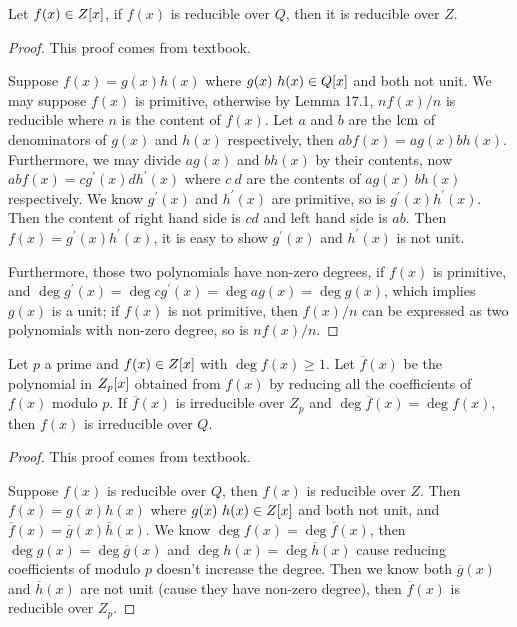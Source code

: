 \documentclass[../main.tex]{subfiles}
\begin{document}
\begin{theorem}
  Let $f(x) \in Z[x]$, if $f(x)$ is reducible over $Q$, then it is reducible over $Z$.
\end{theorem}
\begin{proof}
  This proof comes from textbook.
  
  Suppose $f(x) = g(x)h(x)$ where $g(x) \ h(x) \in Q[x]$ and both not unit.
  We may suppose $f(x)$ is primitive, otherwise by Lemma 17.1, $nf(x)/n$ is reducible where $n$ is the content of $f(x)$.
  Let $a$ and $b$ are the $\operatorname{lcm}$ of denominators of $g(x)$ and $h(x)$ respectively,
  then $abf(x) = ag(x)bh(x)$. Furthermore, we may divide $ag(x)$ and $bh(x)$ by their
  contents, now $abf(x) = cg^\prime(x)dh^\prime(x)$ where $c \ d$ are
  the contents of $ag(x) \ bh(x)$ respectively.
  We know $g^\prime(x)$ and $h^\prime(x)$ are primitive, so is $g^\prime(x)h^\prime(x)$.
  Then the content of right hand side is $cd$ and left hand side is $ab$.
  Then $f(x) = g^\prime(x)h^\prime(x)$, it is easy to show $g^\prime(x)$ and $h^\prime(x)$
  is not unit.

  Furthermore, those two polynomials have non-zero degrees, 
  if $f(x)$ is primitive, and $\deg g^\prime(x) = \deg cg^\prime(x) = \deg ag(x) = \deg g(x)$,
  which implies $g(x)$ is a unit;
  if $f(x)$ is not primitive, then $f(x)/n$ can be expressed as two polynomials with non-zero degree,
  so is $nf(x)/n$.
\end{proof}

\begin{theorem}
  Let $p$ a prime and $f(x) \in Z[x]$ with $\deg f(x) \geq 1$.
  Let $\overline{f}(x)$ be the polynomial in $Z_p[x]$ obtained
  from $f(x)$ by reducing all the coefficients of $f(x)$ modulo $p$.
  If $\overline{f}(x)$ is irreducible over $Z_p$ and $\deg \overline{f}(x) = \deg f(x)$,
  then $f(x)$ is irreducible over $Q$.
\end{theorem}
\begin{proof}
  This proof comes from textbook.

  Suppose $f(x)$ is reducible over $Q$, then $f(x)$ is reducible over $Z$.
  Then $f(x) = g(x)h(x)$ where $g(x) \ h(x) \in Z[x]$ and both not unit,
  and $\overline{f}(x) = \overline{g}(x) \overline{h}(x)$. We know $\deg f(x) = \deg \overline{f}(x)$,
  then $\deg g(x) = \deg \overline{g}(x)$ and $\deg h(x) = \deg \overline{h}(x)$
  cause reducing coefficients of modulo $p$ doesn't increase the degree.
  Then we know both $\overline{g}(x)$ and $\overline{h}(x)$ are not unit (cause they have non-zero degree),
  then $\overline{f}(x)$ is reducible over $Z_p$.
\end{proof}
\end{document}

